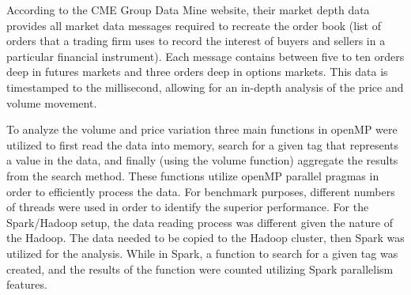 \documentclass[12pt]{article} %
\begin{document}


According to the CME Group Data Mine website, their market depth data provides all market data messages required to recreate the order book (list of orders that a trading firm uses to record the interest of buyers and sellers in a particular financial instrument). Each message contains between five to ten orders deep in futures markets and three orders deep in options markets. This data is timestamped to the millisecond, allowing for an in-depth analysis of the price and volume movement. 

To analyze the volume and price variation three main functions in openMP were utilized to first read the data into memory, search for a given tag that represents a value in the data, and finally (using the volume function) aggregate the results from the search method. These functions utilize openMP parallel pragmas in order to efficiently process the data. For benchmark purposes, different numbers of threads were used in order to identify the superior performance. For the Spark/Hadoop setup, the data reading process was different given the nature of the Hadoop. The data needed to be copied to the Hadoop cluster, then Spark was utilized for the analysis. While in Spark, a function to search for a given tag was created, and the results of the function were counted utilizing Spark parallelism features. 
\end{document}

